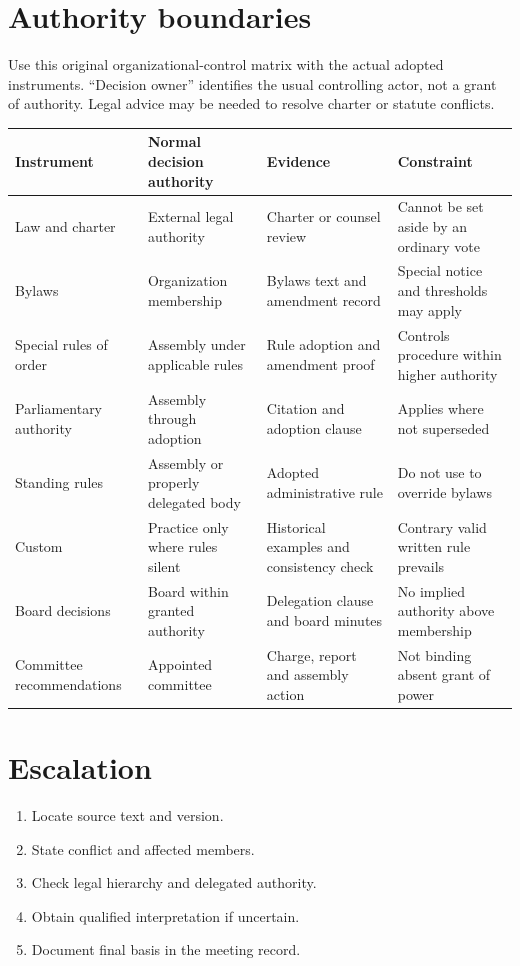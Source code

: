 \documentclass[11pt]{article}
\begin{document}
\SuiteOpen
{}
\section{Authority boundaries}
Use this original organizational-control matrix with the actual adopted instruments. “Decision owner” identifies the usual controlling actor, not a grant of authority. Legal advice may be needed to resolve charter or statute conflicts.

\small\begin{longtable}{@{}p{.19\linewidth}p{.20\linewidth}p{.26\linewidth}p{.27\linewidth}@{}}\toprule Instrument & Normal decision authority & Evidence & Constraint\\\midrule\endhead
Law and charter & External legal authority & Charter or counsel review & Cannot be set aside by an ordinary vote\\
Bylaws & Organization membership & Bylaws text and amendment record & Special notice and thresholds may apply\\
Special rules of order & Assembly under applicable rules & Rule adoption and amendment proof & Controls procedure within higher authority\\
Parliamentary authority & Assembly through adoption & Citation and adoption clause & Applies where not superseded\\
Standing rules & Assembly or properly delegated body & Adopted administrative rule & Do not use to override bylaws\\
Custom & Practice only where rules silent & Historical examples and consistency check & Contrary valid written rule prevails\\
Board decisions & Board within granted authority & Delegation clause and board minutes & No implied authority above membership\\
Committee recommendations & Appointed committee & Charge, report and assembly action & Not binding absent grant of power\\
\bottomrule\end{longtable}\normalsize
\section{Escalation}
\begin{enumerate}[leftmargin=*,itemsep=4pt]
\item Locate source text and version.
\item State conflict and affected members.
\item Check legal hierarchy and delegated authority.
\item Obtain qualified interpretation if uncertain.
\item Document final basis in the meeting record.
\end{enumerate}
\end{document}
